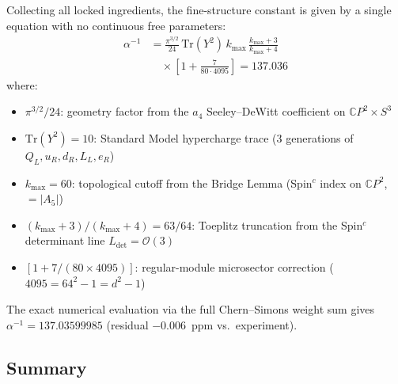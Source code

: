 Collecting all locked ingredients, the fine-structure constant is given
by a single equation with no continuous free parameters:
\begin{equation}\label{eq:alpha-one-liner}
\boxed{\;
\begin{aligned}
\alpha^{-1} &= \frac{\pi^{3/2}}{24}\,\mathrm{Tr}(Y^2)\,k_{\max}\,
\frac{k_{\max}\!+\!3}{k_{\max}\!+\!4}\\[4pt]
&\quad\times\!\left[1 + \frac{7}{80\!\cdot\!4095}\right]
= 137.036
\end{aligned}
\;}
\end{equation}
where:
\begin{itemize}[nosep]
\item $\pi^{3/2}/24$: geometry factor from the $a_4$ Seeley--DeWitt
  coefficient on $\mathbb{C}P^2 \times S^3$
\item $\mathrm{Tr}(Y^2) = 10$: Standard Model hypercharge trace
  (3 generations of $Q_L, u_R, d_R, L_L, e_R$)
\item $k_{\max} = 60$: topological cutoff from the Bridge Lemma
  (Spin$^c$ index on $\mathbb{C}P^2$, $= |A_5|$)
\item $(k_{\max}+3)/(k_{\max}+4) = 63/64$: Toeplitz truncation
  from the Spin$^c$ determinant line $L_{\det} = \mathcal{O}(3)$
\item $[1 + 7/(80 \times 4095)]$: regular-module microsector
  correction ($4095 = 64^2 - 1 = d^2 - 1$)
\end{itemize}
The exact numerical evaluation via the full Chern--Simons weight sum
gives $\alpha^{-1} = 137.03599985$ (residual $-0.006$~ppm vs.\
experiment).

\subsection{Summary}\label{sec:alpha-locked-summary}

